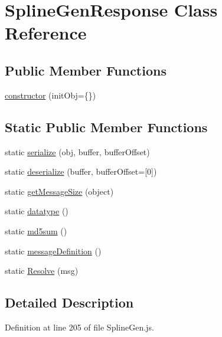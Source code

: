 \hypertarget{class_spline_gen_response}{}\section{Spline\+Gen\+Response Class Reference}
\label{class_spline_gen_response}
\subsection*{Public Member Functions}
\begin{DoxyCompactItemize}
\item 
\hyperlink{class_spline_gen_response_a5cc82dc4f1e3b09aff14f77dc19746f7}{constructor} (init\+Obj=\{\})
\end{DoxyCompactItemize}
\subsection*{Static Public Member Functions}
\begin{DoxyCompactItemize}
\item 
static \hyperlink{class_spline_gen_response_a4a6c37910e101837c3cb7becdb1564b5}{serialize} (obj, buffer, buffer\+Offset)
\item 
static \hyperlink{class_spline_gen_response_a0dd436d8756442567ac38bde1a291d54}{deserialize} (buffer, buffer\+Offset=\mbox{[}0\mbox{]})
\item 
static \hyperlink{class_spline_gen_response_a35bbef560f20ba314e5da8b671209094}{get\+Message\+Size} (object)
\item 
static \hyperlink{class_spline_gen_response_aed970864853a658e91eb1c3b18cbbb45}{datatype} ()
\item 
static \hyperlink{class_spline_gen_response_a1d0274b80a29201fdac3b325d0f2d791}{md5sum} ()
\item 
static \hyperlink{class_spline_gen_response_abbfda96f32b6cb2bdf6eddc2c76740db}{message\+Definition} ()
\item 
static \hyperlink{class_spline_gen_response_ac17e698f3ecc3ddc64927b94ec8ca1e0}{Resolve} (msg)
\end{DoxyCompactItemize}


\subsection{Detailed Description}


Definition at line 205 of file Spline\+Gen.\+js.



